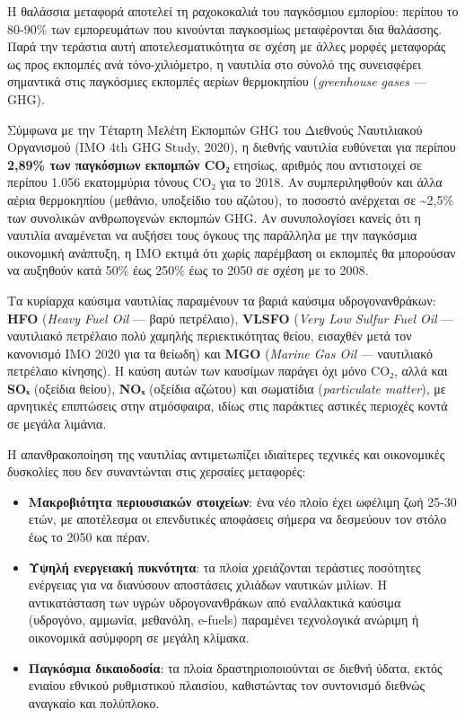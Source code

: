 \documentclass[11pt,a4paper,greek,twoside]{template-xe}
\providecommand{\tightlist}{\setlength{\itemsep}{0pt}\setlength{\parskip}{0pt}}
\begin{document}
Η θαλάσσια μεταφορά αποτελεί τη ραχοκοκαλιά του παγκόσμιου εμπορίου:
περίπου το 80-90\% των εμπορευμάτων που κινούνται παγκοσμίως
μεταφέρονται δια θαλάσσης. Παρά την τεράστια αυτή αποτελεσματικότητα σε
σχέση με άλλες μορφές μεταφοράς ως προς εκπομπές ανά τόνο-χιλιόμετρο, η
ναυτιλία στο σύνολό της συνεισφέρει σημαντικά στις παγκόσμιες εκπομπές
αερίων θερμοκηπίου (\emph{greenhouse gases} --- GHG).

Σύμφωνα με την Τέταρτη Μελέτη Εκπομπών GHG του Διεθνούς Ναυτιλιακού
Οργανισμού (IMO 4th GHG Study, 2020), η διεθνής ναυτιλία ευθύνεται για
περίπου \textbf{2,89\% των παγκόσμιων εκπομπών CO₂} ετησίως, αριθμός που
αντιστοιχεί σε περίπου 1.056 εκατομμύρια τόνους CO₂ για το 2018. Αν
συμπεριληφθούν και άλλα αέρια θερμοκηπίου (μεθάνιο, υποξείδιο του
αζώτου), το ποσοστό ανέρχεται σε \textasciitilde2,5\% των συνολικών
ανθρωπογενών εκπομπών GHG. Αν συνυπολογίσει κανείς ότι η ναυτιλία
αναμένεται να αυξήσει τους όγκους της παράλληλα με την παγκόσμια
οικονομική ανάπτυξη, η IMO εκτιμά ότι χωρίς παρέμβαση οι εκπομπές θα
μπορούσαν να αυξηθούν κατά 50\% έως 250\% έως το 2050 σε σχέση με το
2008.

Τα κυρίαρχα καύσιμα ναυτιλίας παραμένουν τα βαριά καύσιμα
υδρογονανθράκων: \textbf{HFO} (\emph{Heavy Fuel Oil} --- βαρύ
πετρέλαιο), \textbf{VLSFO} (\emph{Very Low Sulfur Fuel Oil} ---
ναυτιλιακό πετρέλαιο πολύ χαμηλής περιεκτικότητας θείου, εισαχθέν μετά
τον κανονισμό IMO 2020 για τα θείωδη) και \textbf{MGO} (\emph{Marine Gas
Oil} --- ναυτιλιακό πετρέλαιο κίνησης). Η καύση αυτών των καυσίμων
παράγει όχι μόνο CO₂, αλλά και \textbf{SOₓ} (οξείδια θείου),
\textbf{NOₓ} (οξείδια αζώτου) και σωματίδια (\emph{particulate matter}),
με αρνητικές επιπτώσεις στην ατμόσφαιρα, ιδίως στις παράκτιες αστικές
περιοχές κοντά σε μεγάλα λιμάνια.

Η απανθρακοποίηση της ναυτιλίας αντιμετωπίζει ιδιαίτερες τεχνικές και
οικονομικές δυσκολίες που δεν συναντώνται στις χερσαίες μεταφορές:

\begin{itemize}
\tightlist
\item
  \textbf{Μακροβιότητα περιουσιακών στοιχείων}: ένα νέο πλοίο έχει
  ωφέλιμη ζωή 25-30 ετών, με αποτέλεσμα οι επενδυτικές αποφάσεις σήμερα
  να δεσμεύουν τον στόλο έως το 2050 και πέραν.
\item
  \textbf{Υψηλή ενεργειακή πυκνότητα}: τα πλοία χρειάζονται τεράστιες
  ποσότητες ενέργειας για να διανύσουν αποστάσεις χιλιάδων ναυτικών
  μιλίων. Η αντικατάσταση των υγρών υδρογονανθράκων από εναλλακτικά
  καύσιμα (υδρογόνο, αμμωνία, μεθανόλη, e-fuels) παραμένει τεχνολογικά
  ανώριμη ή οικονομικά ασύμφορη σε μεγάλη κλίμακα.
\item
  \textbf{Παγκόσμια δικαιοδοσία}: τα πλοία δραστηριοποιούνται σε διεθνή
  ύδατα, εκτός ενιαίου εθνικού ρυθμιστικού πλαισίου, καθιστώντας τον
  συντονισμό διεθνώς αναγκαίο και πολύπλοκο.
\end{itemize}
\end{document}
